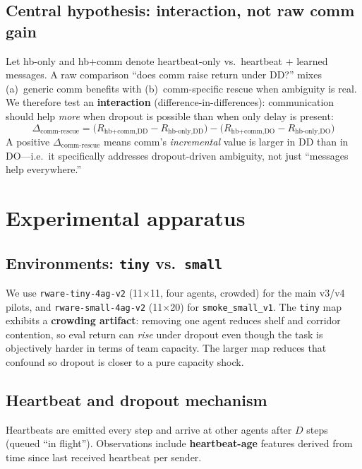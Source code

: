 \documentclass[conference,onecolumn]{IEEEtran}
\begin{document}
\subsection{Central hypothesis: interaction, not raw comm gain}

Let hb-only and hb+comm denote heartbeat-only vs.\ heartbeat + learned messages. A raw comparison ``does comm raise return under DD?'' mixes (a)~generic comm benefits with (b)~comm-specific rescue when ambiguity is real. We therefore test an \textbf{interaction} (difference-in-differences): communication should help \emph{more} when dropout is possible than when only delay is present:
\begin{equation*}
\Delta_{\text{comm-rescue}}
= \bigl(R_{\text{hb+comm,DD}} - R_{\text{hb-only,DD}}\bigr)
- \bigl(R_{\text{hb+comm,DO}} - R_{\text{hb-only,DO}}\bigr)
\end{equation*}
A positive $\Delta_{\text{comm-rescue}}$ means comm's \emph{incremental} value is larger in DD than in DO---i.e.\ it specifically addresses dropout-driven ambiguity, not just ``messages help everywhere.''

\section{Experimental apparatus}

\subsection{Environments: \texttt{tiny} vs.\ \texttt{small}}

We use \texttt{rware-tiny-4ag-v2} (11$\times$11, four agents, crowded) for the main v3/v4 pilots, and \texttt{rware-small-4ag-v2} (11$\times$20) for \texttt{smoke\_small\_v1}. The \texttt{tiny} map exhibits a \textbf{crowding artifact}: removing one agent reduces shelf and corridor contention, so eval return can \emph{rise} under dropout even though the task is objectively harder in terms of team capacity. The larger map reduces that confound so dropout is closer to a pure capacity shock.

\subsection{Heartbeat and dropout mechanism}

Heartbeats are emitted every step and arrive at other agents after $D$ steps (queued ``in flight''). Observations include \textbf{heartbeat-age} features derived from time since last received heartbeat per sender.
\end{document}
